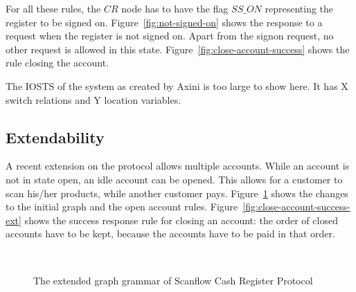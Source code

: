 For all these rules, the $CR$ node has to have the flag $\mathit{SS\_ON}$ representing the register to be signed on. Figure~\ref{fig:not-signed-on} shows the response to a request when the register is not signed on. Apart from the signon request, no other request is allowed in this state. Figure~\ref{fig:close-account-success} shows the rule closing the account.

The IOSTS of the system as created by Axini is too large to show here. It has X switch relations and Y location variables. 

\subsection{Extendability}
A recent extension on the protocol allows multiple accounts. While an account is not in state open, an idle account can be opened. This allows for a customer to scan his/her products, while another customer pays. Figure~\ref{fig:gg-fwgc-extended} shows the changes to the initial graph and the open account rules. Figure~\ref{fig:close-account-success-ext} shows the success response rule for closing an account: the order of closed accounts have to be kept, because the accounts have to be paid in that order.

\begin{figure}[ht]
  \begin{center}
    \hspace{20px}
    \\
    \hspace{20px}
  \end{center}
  \caption{The extended graph grammar of Scanflow Cash Register Protocol}
  \label{fig:gg-fwgc-extended}
\end{figure}